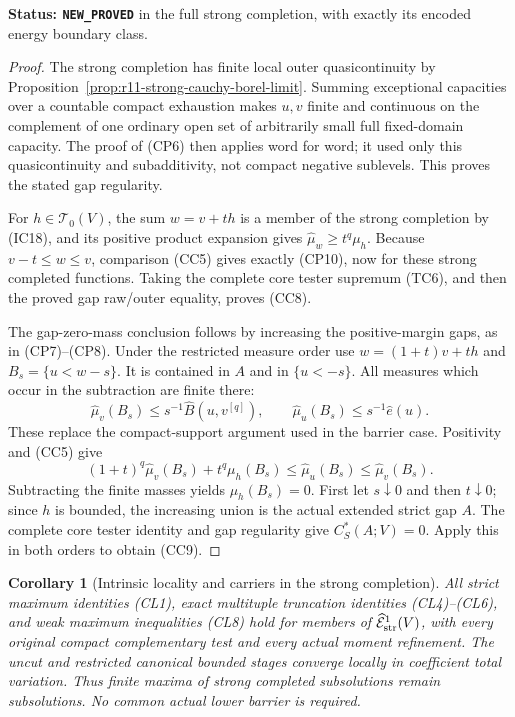 \documentclass[11pt,a4paper]{article}
\numberwithin{equation}{section}
\newtheorem{corollary}[theorem]{Corollary}
\theoremstyle{definition}
\theoremstyle{remark}
\begin{document}
\noindent\textbf{Status: \texttt{NEW\_PROVED}} in the full
strong completion, with exactly its encoded energy boundary class.

\begin{proof}
The strong completion has finite local outer quasicontinuity
by Proposition~\ref{prop:r11-strong-cauchy-borel-limit}.
Summing exceptional capacities over a countable compact
exhaustion makes $u,v$ finite and continuous on the complement
of one ordinary open set of arbitrarily small full fixed-domain
capacity. The proof of (CP6) then applies word for word; it
used only this quasicontinuity and subadditivity, not compact
negative sublevels. This proves the stated gap regularity.

For $h\in\mathscr T_0(V)$, the sum $w=v+t h$ is a member
of the strong completion by (IC18), and its positive product
expansion gives $\widehat\mu_w\geq t^q\mu_h$.
Because $v-t\leq w\leq v$, comparison (CC5) gives exactly
(CP10), now for these strong completed functions. Taking the
complete core tester supremum (TC6), and then the proved gap
raw/outer equality, proves (CC8).

The gap-zero-mass conclusion follows by increasing the
positive-margin gaps, as in (CP7)--(CP8). Under the restricted
measure order use $w=(1+t)v+t h$ and $B_s=\{u<w-s\}$.
It is contained in $A$ and in $\{u<-s\}$.
All measures which occur in the subtraction are finite there:
\[
 \widehat\mu_v(B_s)\leq s^{-1}\widehat B(u,v^{[q]}),\qquad
 \widehat\mu_u(B_s)\leq s^{-1}\widehat e(u).
\]
These replace the compact-support argument used in the barrier
case. Positivity and (CC5) give
\[
 (1+t)^q\widehat\mu_v(B_s)+t^q\mu_h(B_s)
        \leq\widehat\mu_u(B_s)\leq\widehat\mu_v(B_s).
 \tag{CC10}
\]
Subtracting the finite masses yields $\mu_h(B_s)=0$.
First let $s\downarrow0$ and then $t\downarrow0$; since $h$
is bounded, the increasing union is the actual extended strict
gap $A$. The complete core tester identity and gap regularity
give $C_S^*(A;V)=0$. Apply this in both orders to obtain (CC9).
\end{proof}

\begin{corollary}[Intrinsic locality and carriers in the strong completion]
\label{cor:r11-strong-completed-locality-carriers}
All strict maximum identities (CL1), exact multituple truncation
identities (CL4)--(CL6), and weak maximum inequalities (CL8)
hold for members of $\widehat{\mathcal E}^1_{\rm str}(V)$,
with every original compact complementary test and every
actual moment refinement. The uncut and restricted canonical
bounded stages converge locally in coefficient total variation.
Thus finite maxima of strong completed subsolutions remain
subsolutions. No common actual lower barrier is required.
\end{corollary}
\end{document}
